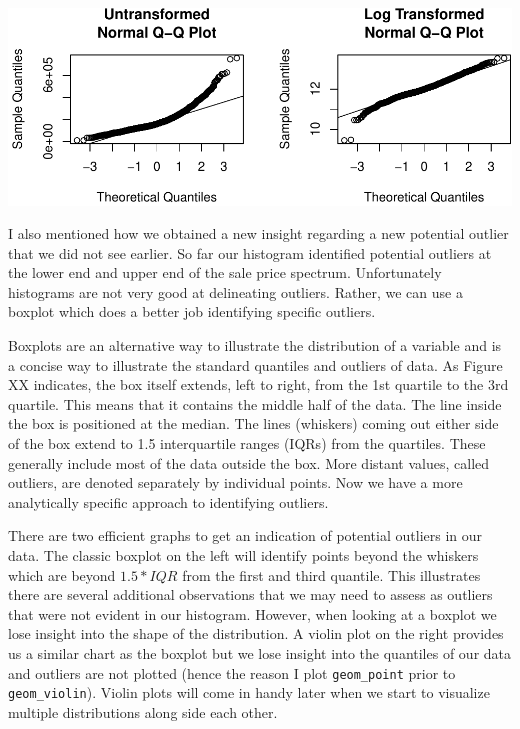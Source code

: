 \documentclass[]{article}
\begin{document}
\begin{center}\includegraphics{Chapter_3_-_Visualization_files/figure-latex/qqplot-1} \end{center}

I also mentioned how we obtained a new insight regarding a new potential
outlier that we did not see earlier. So far our histogram identified
potential outliers at the lower end and upper end of the sale price
spectrum. Unfortunately histograms are not very good at delineating
outliers. Rather, we can use a boxplot which does a better job
identifying specific outliers.

Boxplots are an alternative way to illustrate the distribution of a
variable and is a concise way to illustrate the standard quantiles and
outliers of data. As Figure XX indicates, the box itself extends, left
to right, from the 1st quartile to the 3rd quartile. This means that it
contains the middle half of the data. The line inside the box is
positioned at the median. The lines (whiskers) coming out either side of
the box extend to 1.5 interquartile ranges (IQRs) from the quartiles.
These generally include most of the data outside the box. More distant
values, called outliers, are denoted separately by individual points.
Now we have a more analytically specific approach to identifying
outliers.

There are two efficient graphs to get an indication of potential
outliers in our data. The classic boxplot on the left will identify
points beyond the whiskers which are beyond \(1.5*IQR\) from the first
and third quantile. This illustrates there are several additional
observations that we may need to assess as outliers that were not
evident in our histogram. However, when looking at a boxplot we lose
insight into the shape of the distribution. A violin plot on the right
provides us a similar chart as the boxplot but we lose insight into the
quantiles of our data and outliers are not plotted (hence the reason I
plot \texttt{geom\_point} prior to \texttt{geom\_violin}). Violin plots
will come in handy later when we start to visualize multiple
distributions along side each other.
\end{document}
